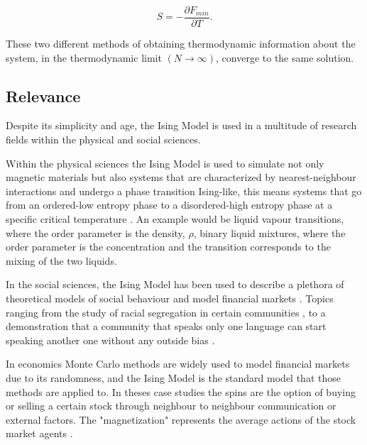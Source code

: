 \begin{equation}
	S = - \frac{\partial F_{min}}{\partial T}.
\end{equation}

	These two different methods of obtaining thermodynamic information about the system, in the thermodynamic limit $(N\rightarrow \infty)$, converge to the same solution. 

\subsection{Relevance}

Despite its simplicity and age, the Ising Model is used in a multitude of research fields within the physical and social sciences. 

Within the physical sciences the Ising Model is used to simulate not only magnetic materials but also systems that are characterized by nearest-neighbour interactions and undergo a phase transition Ising-like, this means systems that go from an ordered-low entropy phase to a disordered-high entropy phase at a specific critical temperature \cite{Pelissetto2002}. 
An example would be liquid vapour transitions, where the order parameter is the density, $\rho$, binary liquid mixtures, where the order parameter is the concentration and the transition corresponds to the mixing of the two liquids.

In the social sciences, the Ising Model has been used to describe a plethora of theoretical models of social behaviour and model financial markets \cite{review_social_ising}. 
Topics ranging from the study of racial segregation in certain communities \cite{segregation}, to a demonstration that a community that speaks only one language can start speaking another one without any outside bias \cite{language_ising}.

In economics Monte Carlo methods are widely used to model financial markets due to its randomness, and the Ising Model is the standard model that those methods are applied to. In theses case studies the spins are the option of buying or selling a certain stock through neighbour to neighbour communication or external factors. The "magnetization" represents the average actions of the stock market agents \cite{stock_ising, eco_thesis}.












